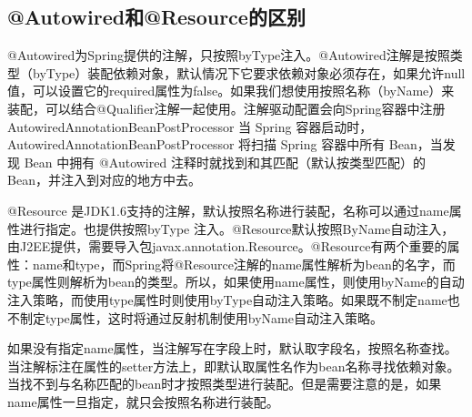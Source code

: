 \documentclass[../../../interview-questions.tex]{subfiles}
\begin{document}
\subsection{@Autowired和@Resource的区别}

@Autowired为Spring提供的注解，只按照byType注入。@Autowired注解是按照类型（byType）装配依赖对象，默认情况下它要求依赖对象必须存在，如果允许null值，可以设置它的required属性为false。如果我们想使用按照名称（byName）来装配，可以结合@Qualifier注解一起使用。注解驱动配置会向Spring容器中注册AutowiredAnnotationBeanPostProcessor
当 Spring 容器启动时，AutowiredAnnotationBeanPostProcessor 将扫描 Spring 容器中所有 Bean，当发现 Bean 中拥有 @Autowired 注释时就找到和其匹配（默认按类型匹配）的 Bean，并注入到对应的地方中去。

@Resource 是JDK1.6支持的注解，默认按照名称进行装配，名称可以通过name属性进行指定。也提供按照byType 注入。@Resource默认按照ByName自动注入，由J2EE提供，需要导入包javax.annotation.Resource。@Resource有两个重要的属性：name和type，而Spring将@Resource注解的name属性解析为bean的名字，而type属性则解析为bean的类型。所以，如果使用name属性，则使用byName的自动注入策略，而使用type属性时则使用byType自动注入策略。如果既不制定name也不制定type属性，这时将通过反射机制使用byName自动注入策略。

如果没有指定name属性，当注解写在字段上时，默认取字段名，按照名称查找。
当注解标注在属性的setter方法上，即默认取属性名作为bean名称寻找依赖对象。
当找不到与名称匹配的bean时才按照类型进行装配。但是需要注意的是，如果name属性一旦指定，就只会按照名称进行装配。
\end{document}
